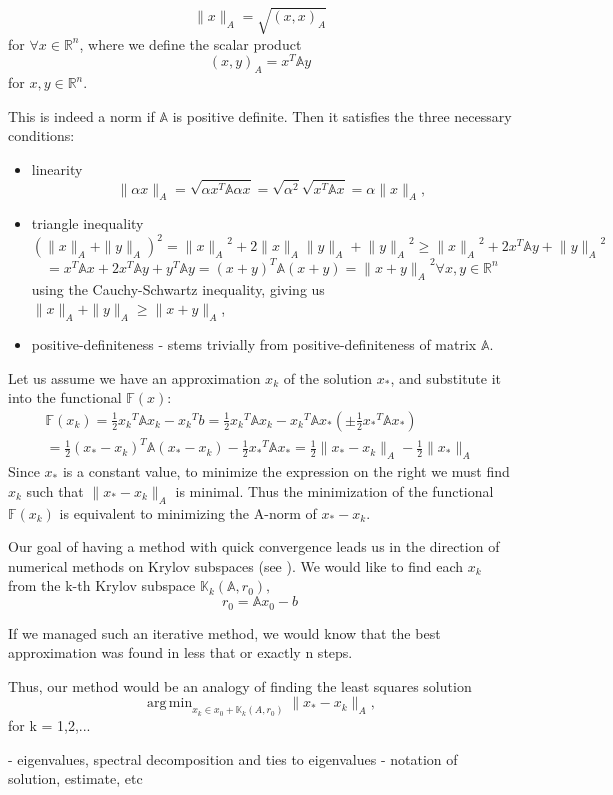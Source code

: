 \[\|x\|_A = \sqrt{(x,x)_A}\] for \(\forall{x}\in\mathbb{R}^n \), where we define the scalar product \[(x,y)_A = x^T\mathbb{A}y \] for \(x,y\in\mathbb{R}^n  \).

This is indeed a norm if \(\mathbb{A} \) is positive definite. Then it satisfies the three necessary conditions:
\begin{itemize}
    \item linearity
    \[\|\alpha x\|_A = \sqrt{\alpha x^T\mathbb{A}\alpha x } = \sqrt{\alpha^2}\sqrt{x^T\mathbb{A} x} = \alpha\|x\|_A, \]
    \item triangle inequality
    \[ (\|x\|_A+\|y\|_A)^2 = {\|x\|_A}^2 + 2\|x\|_A\|y\|_A +  {\|y\|_A}^2\geq {\|x\|_A}^2 + 2x^T\mathbb{A}y +  {\|y\|_A}^2 \]
    \[ = x^T\mathbb{A}x + 2x^T\mathbb{A}y + y^T\mathbb{A}y = (x+y)^T\mathbb{A}(x+y) = {\|x+y\|_A}^2 \forall x,y \in\mathbb{R}^n\]
    using the Cauchy-Schwartz inequality, giving us \(\|x\|_A+\|y\|_A \geq \|x+y\|_A\),
    \item positive-definiteness - stems trivially from positive-definiteness of matrix \(\mathbb{A}\).
\end{itemize}

Let us assume we have an approximation \(x_k\) of the solution \(x_*\), and substitute it into the functional \(\mathbb{F}(x)\):
\begin{equation}
\begin{split}
\mathbb{F}(x_k) = \frac{1}{2}{x_k}^{T}\mathbb{A}x_k - {x_k}^{T}b = \frac{1}{2}{x_k}^{T}\mathbb{A}x_k - {x_k}^{T}\mathbb{A}x_* (\pm\frac{1}{2}{x_*}^{T}\mathbb{A}x_*) \\ = \frac{1}{2}{(x_*-x_k)}^{T}\mathbb{A}(x_*-x_k) - \frac{1}{2}{x_*}^{T}\mathbb{A}x_* = \frac{1}{2}\|x_* - x_k\|_A-\frac{1}{2}\|x_*\|_A
\end{split}
\end{equation}
Since \(x_*\) is a constant value, to minimize the expression on the right we must find \(x_k\) such that \(\|x_* - x_k\|_A\) is minimal. Thus the minimization of the functional \(\mathbb{F}(x_k)\) is equivalent to minimizing the A-norm of \(x_* - x_k \).

Our goal of having a method with quick convergence leads us in the direction of numerical methods on Krylov subspaces (see \cite{LiesenStrakos12}). We would like to find each \(x_k\) from the k-th Krylov subspace \(\mathbb{K}_k(\mathbb{A},r_0), \)
\begin{equation}
r_0 =\mathbb{A}x_0 - b
\end{equation}

If we managed such an iterative method, we would know that the best approximation was found in less that or exactly n steps.

Thus, our method would be an analogy of finding the least squares solution  
\begin{equation}
    \operatorname{arg\,min}_{x_k \in x_0 + \mathbb{K}_k(A,r_0)} \|x_* - x_k\|_A,
\end{equation}
 for k = 1,2,...


- eigenvalues, spectral decomposition and ties to eigenvalues
- notation of solution, estimate, etc
